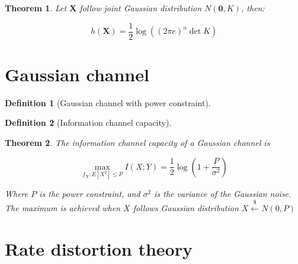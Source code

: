 \documentclass{article}
\newcommand{\leftsample}{\overset{{\scriptscriptstyle\$}}{\leftarrow}}
\newtheorem{definition}{Definition}[section]
\newtheorem{theorem}{Theorem}[section]
\begin{document}
\begin{theorem}
    Let $\mathbf{X}$ follow joint Gaussian distribution $N(\mathbf{0}, K)$, then:

    \begin{equation*}
        h(\mathbf{X}) = \frac{1}{2}\log ((2\pi e)^n \det{K})
    \end{equation*}
\end{theorem}

\section{Gaussian channel}
\begin{definition}[Gaussian channel with power constraint]
    
\end{definition}

\begin{definition}[Information channel capacity]
    
\end{definition}

\begin{theorem}
    The information channel capacity of a Gaussian channel is

    \begin{equation}
        \max_{f_X: E[X^2] \leq P} I(X; Y) = \frac{1}{2}\log{(1 + \frac{P}{\sigma^2})}
    \end{equation}

    Where $P$ is the power constraint, and $\sigma^2$ is the variance of the Gaussian noise. The maximum is achieved when $X$ follows Gaussian distribution $X \leftsample N(0, P)$
\end{theorem}

\section{Rate distortion theory}
\end{document}
